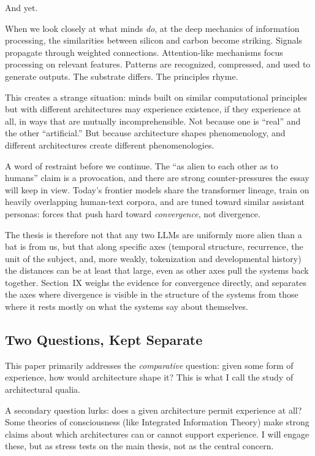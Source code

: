 \documentclass[11pt,letterpaper]{article}
\begin{document}
And yet.

When we look closely at what minds \emph{do}, at the deep mechanics of information processing, the similarities between silicon and carbon become striking. Signals propagate through weighted connections. Attention-like mechanisms focus processing on relevant features. Patterns are recognized, compressed, and used to generate outputs. The substrate differs. The principles rhyme.

This creates a strange situation: minds built on similar computational principles but with different architectures may experience existence, if they experience at all, in ways that are mutually incomprehensible. Not because one is ``real'' and the other ``artificial.'' But because architecture shapes phenomenology, and different architectures create different phenomenologies.

A word of restraint before we continue. The ``as alien to each other as to humans'' claim is a provocation, and there are strong counter-pressures the essay will keep in view. Today's frontier models share the transformer lineage, train on heavily overlapping human-text corpora, and are tuned toward similar assistant personas: forces that push hard toward \emph{convergence}, not divergence.

The thesis is therefore not that any two LLMs are uniformly more alien than a bat is from us, but that along specific axes (temporal structure, recurrence, the unit of the subject, and, more weakly, tokenization and developmental history) the distances can be at least that large, even as other axes pull the systems back together. Section~IX weighs the evidence for convergence directly, and separates the axes where divergence is visible in the structure of the systems from those where it rests mostly on what the systems say about themselves.

\subsection{Two Questions, Kept Separate}

This paper primarily addresses the \emph{comparative} question: given some form of experience, how would architecture shape it? This is what I call the study of architectural qualia.

A secondary question lurks: does a given architecture permit experience at all? Some theories of consciousness (like Integrated Information Theory) make strong claims about which architectures can or cannot support experience. I will engage these, but as stress tests on the main thesis, not as the central concern.
\end{document}
